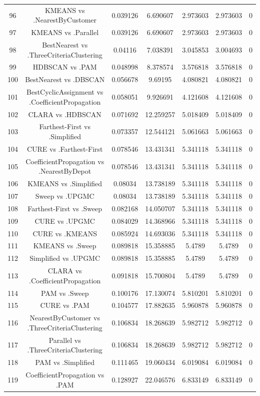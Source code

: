 \documentclass[a4paper,10pt]{article}
\begin{document}
\begin{landscape}
\begin{table}[!htp]
\begin{tabular}{ccccccc}
96&KMEANS vs .NearestByCustomer&0.039126&6.690607&2.973603&2.973603&0\\
97&KMEANS vs .Parallel&0.039126&6.690607&2.973603&2.973603&0\\
98&BestNearest vs .ThreeCriteriaClustering&0.04116&7.038391&3.045853&3.004693&0\\
99&HDBSCAN vs .PAM&0.048998&8.378574&3.576818&3.576818&0\\
100&BestNearest vs .DBSCAN&0.056678&9.69195&4.080821&4.080821&0\\
101&BestCyclicAssignment vs .CoefficientPropagation&0.058051&9.926691&4.121608&4.121608&0\\
102&CLARA vs .HDBSCAN&0.071692&12.259257&5.018409&5.018409&0\\
103&Farthest-First vs .Simplified&0.073357&12.544121&5.061663&5.061663&0\\
104&CURE vs .Farthest-First&0.078546&13.431341&5.341118&5.341118&0\\
105&CoefficientPropagation vs .NearestByDepot&0.078546&13.431341&5.341118&5.341118&0\\
106&KMEANS vs .Simplified&0.08034&13.738189&5.341118&5.341118&0\\
107&Sweep vs .UPGMC&0.08034&13.738189&5.341118&5.341118&0\\
108&Farthest-First vs .Sweep&0.082168&14.050707&5.341118&5.341118&0\\
109&CURE vs .UPGMC&0.084029&14.368966&5.341118&5.341118&0\\
110&CURE vs .KMEANS&0.085924&14.693036&5.341118&5.341118&0\\
111&KMEANS vs .Sweep&0.089818&15.358885&5.4789&5.4789&0\\
112&Simplified vs .UPGMC&0.089818&15.358885&5.4789&5.4789&0\\
113&CLARA vs .CoefficientPropagation&0.091818&15.700804&5.4789&5.4789&0\\
114&PAM vs .Sweep&0.100176&17.130074&5.810201&5.810201&0\\
115&CURE vs .PAM&0.104577&17.882635&5.960878&5.960878&0\\
116&NearestByCustomer vs .ThreeCriteriaClustering&0.106834&18.268639&5.982712&5.982712&0\\
117&Parallel vs .ThreeCriteriaClustering&0.106834&18.268639&5.982712&5.982712&0\\
118&PAM vs .Simplified&0.111465&19.060434&6.019084&6.019084&0\\
119&CoefficientPropagation vs .PAM&0.128927&22.046576&6.833149&6.833149&0\\

\end{tabular}
\end{table}
\end{landscape}
\end{document}

